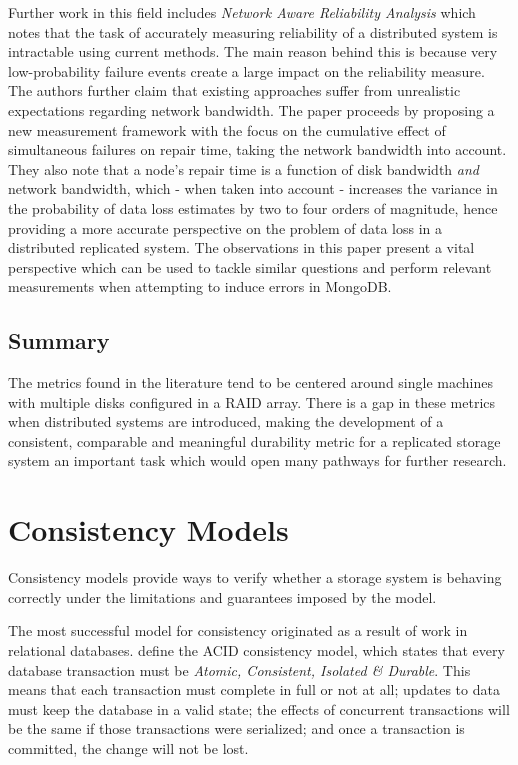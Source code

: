 Further work in this field includes \textit{Network Aware Reliability Analysis} \citep{network-aware-reliability} which notes that the task of accurately measuring reliability of a distributed system is intractable using current methods. The main reason behind this is because very low-probability failure events create a large impact on the reliability measure. The authors further claim that existing approaches suffer from unrealistic expectations regarding network bandwidth. The paper proceeds by proposing a new measurement framework with the focus on the cumulative effect of simultaneous failures on repair time, taking the network bandwidth into account. They also note that a node's repair time is a function of disk bandwidth \textit{and} network bandwidth, which - when taken into account - increases the variance in the probability of data loss estimates by two to four orders of magnitude, hence providing a more accurate perspective on the problem of data loss in a distributed replicated system. The observations in this paper present a vital perspective which can be used to tackle similar questions and perform relevant measurements when attempting to induce errors in MongoDB.

\subsection{Summary}
The metrics found in the literature tend to be centered around single machines with multiple disks configured in a RAID array. There is a gap in these metrics when distributed systems are introduced, making the development of a consistent, comparable and meaningful durability metric for a replicated storage system an important task which would open many pathways for further research.

\section{Consistency Models}
Consistency models provide ways to verify whether a storage system is behaving correctly under the limitations and guarantees imposed by the model.

The most successful model for consistency originated as a result of work in relational databases. \citet{acid} define the ACID consistency model, which states that every database transaction must be \textit{Atomic, Consistent, Isolated \& Durable}. This means that each transaction must complete in full or not at all; updates to data must keep the database in a valid state; the effects of concurrent transactions will be the same if those transactions were serialized; and once a transaction is committed, the change will not be lost. 

